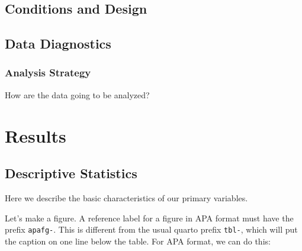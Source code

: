 \documentclass[
  floatsintext,
  man,
  colorlinks=true,linkcolor=blue,citecolor=blue,urlcolor=blue,biblatex]{apa7}
\begin{document}
\hypertarget{conditions-and-design}{%
\subsection{Conditions and Design}\label{conditions-and-design}}

\hypertarget{data-diagnostics}{%
\subsection{Data Diagnostics}\label{data-diagnostics}}

\hypertarget{analysis-strategy}{%
\subsubsection{Analysis Strategy}\label{analysis-strategy}}

How are the data going to be analyzed?

\hypertarget{results}{%
\section{Results}\label{results}}

\hypertarget{descriptive-statistics}{%
\subsection{Descriptive Statistics}\label{descriptive-statistics}}

Here we describe the basic characteristics of our primary variables.

Let's make a figure. A reference label for a figure in APA format must
have the prefix \texttt{apafg-}. This is different from the usual quarto
prefix \texttt{tbl-}, which will put the caption on one line below the
table. For APA format, we can do this:
\end{document}
